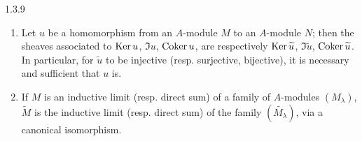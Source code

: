 \begin{envs}[Corollary]{1.3.9}
\label{cor-1.1.3.9}
\begin{enumerate}[label=\rm{(\roman*)}]
  \item Let $u$ be a homomorphism from an $A$-module $M$ to an $A$-module $N$; then the
        sheaves associated to ${\mathop{\mathrm{Ker}}\nolimits}\, u$, $\Im u$, ${\mathop{\mathrm{Coker}}\nolimits}\, u$, are respectively
        ${\mathop{\mathrm{Ker}}\nolimits}\,\widetilde{u}$, $\Im\widetilde{u}$, ${\mathop{\mathrm{Coker}}\nolimits}\,\widetilde{u}$. In particular, for
        $\widetilde{u}$ to be injective (resp. surjective, bijective), it is necessary and
        sufficient that $u$ is.
  \item If $M$ is an inductive limit (resp. direct sum) of a family of $A$-modules
        $(M_\lambda)$, $\widetilde{M}$ is the inductive limit (resp. direct sum) of the
        family $(\widetilde{M_\lambda})$, via a canonical isomorphism.
\end{enumerate}
\end{envs}
